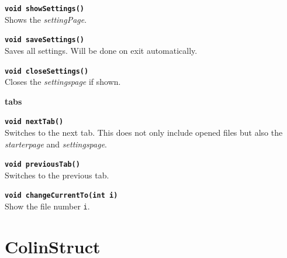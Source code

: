 \begin{trivlist}
\begin{trivlist}
		\item[]\textbf{\texttt{void showSettings()}}\\ Shows the \textit{settingPage}.
		\item[]\textbf{\texttt{void saveSettings()}}\\ Saves all settings. Will be done on exit automatically.
		\item[]\textbf{\texttt{void closeSettings()}}\\ Closes the \textit{settingspage} if shown.
	\end{trivlist}
	\item[]\textbf{tabs}
	\begin{trivlist}
		\leftskip=1cm
		\item[]\textbf{\texttt{void nextTab()}}\\ Switches to the next tab. This does not only include opened files but also the \textit{starterpage} and \textit{settingspage}.
		\item[]\textbf{\texttt{void previousTab()}}\\ Switches to the previous tab. 
		\item[]\textbf{\texttt{void changeCurrentTo(int i)}}\\ Show the file number \texttt{i}.
	\end{trivlist}
\end{trivlist}

\section{ColinStruct}
\label{sec:jsColinStruct}


